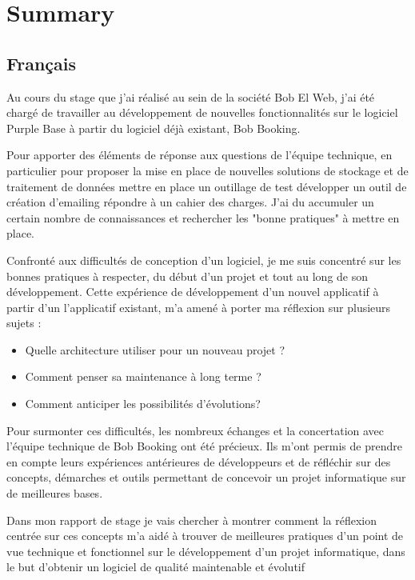 
\chapter{Summary}

\section{Français}

Au cours du stage que j’ai réalisé au sein de la société Bob El Web, j’ai été chargé de travailler au développement de nouvelles fonctionnalités sur le logiciel Purple Base à partir du logiciel déjà existant, Bob Booking.

Pour apporter des éléments de réponse aux questions de l'équipe technique, en particulier pour
proposer la mise en place de nouvelles solutions de stockage et de traitement de données mettre en place un outillage de test développer un outil de création d'emailing répondre à un cahier des charges.  
J’ai du accumuler un certain nombre de connaissances et rechercher les "bonne pratiques" à mettre en place.
 
Confronté aux difficultés de conception d'un logiciel, je me suis concentré sur les bonnes pratiques à respecter, du début d’un projet et tout au long de son développement. 
Cette expérience de développement d'un nouvel applicatif à partir d’un l'applicatif existant, m'a amené à porter ma réflexion sur plusieurs sujets :

\begin{itemize}
\item Quelle architecture utiliser pour un nouveau projet ? 
\item Comment penser sa maintenance à long terme ? 
\item Comment anticiper les possibilités d'évolutions? 
\end{itemize}

Pour surmonter ces difficultés, les nombreux échanges et la concertation avec l'équipe technique de Bob Booking ont été précieux. 
Ils m’ont permis de prendre en compte leurs expériences antérieures de développeurs et de réfléchir sur des concepts, démarches et outils permettant de concevoir un projet informatique sur de meilleures bases. 

Dans mon rapport de stage je vais chercher à montrer comment la réflexion centrée sur ces concepts m'a aidé à trouver de meilleures pratiques d'un point de vue technique et fonctionnel sur le développement d'un projet informatique, dans le but d'obtenir un logiciel de qualité maintenable et évolutif

